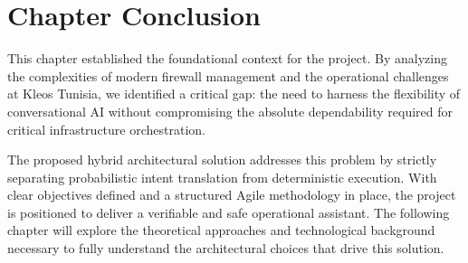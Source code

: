 \section{Chapter Conclusion}
This chapter established the foundational context for the project. By analyzing the complexities of modern firewall management and the operational challenges at Kleos Tunisia, we identified a critical gap: the need to harness the flexibility of conversational AI without compromising the absolute dependability required for critical infrastructure orchestration. 

The proposed hybrid architectural solution addresses this problem by strictly separating probabilistic intent translation from deterministic execution. With clear objectives defined and a structured Agile methodology in place, the project is positioned to deliver a verifiable and safe operational assistant. The following chapter will explore the theoretical approaches and technological background necessary to fully understand the architectural choices that drive this solution.
